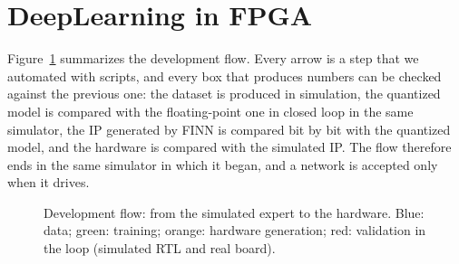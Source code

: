 \documentclass{article}
\begin{document}
\section{DeepLearning in FPGA}
\label{sec:method}
Figure~\ref{fig:flow} summarizes the development flow. Every arrow is a step that we automated with scripts, and every box that produces numbers can be checked
against the previous one: the dataset is produced in simulation, the quantized model is compared with the floating-point one in closed loop in the same simulator,
the IP generated by FINN is compared bit by bit with the quantized model, and the hardware is compared with the simulated IP. The flow therefore ends in the same
simulator in which it began, and a network is accepted only when it drives.

\begin{figure}[t]
\centering
{}
\caption{Development flow: from the simulated expert to the hardware. Blue: data; green: training; orange: hardware generation; red: validation in the loop
(simulated RTL and real board).}
\label{fig:flow}
\end{figure}
\end{document}
